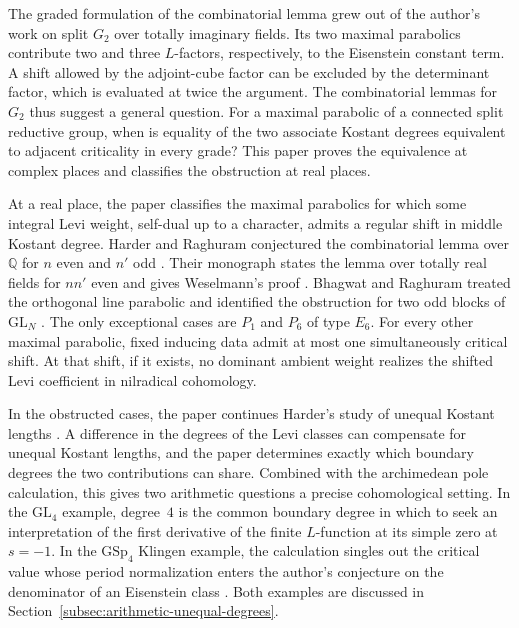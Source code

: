 \documentclass[12pt]{amsart}
\numberwithin{equation}{section}
\theoremstyle{plain}
\theoremstyle{definition}
\theoremstyle{remark}
\newcommand{\GL}{\mathrm{GL}}
\newcommand{\GSp}{\mathrm{GSp}}
\begin{document}
The graded formulation of the combinatorial lemma grew out of the author's work on split $G_2$ over totally imaginary fields. Its two maximal parabolics contribute two and three $L$-factors, respectively, to the Eisenstein constant term. A shift allowed by the adjoint-cube factor can be excluded by the determinant factor, which is evaluated at twice the argument. The combinatorial lemmas for $G_2$ \cite[Lemmas~6.1--6.2]{HosseiniJafariG2} thus suggest a general question. For a maximal parabolic of a connected split reductive group, when is equality of the two associate Kostant degrees equivalent to adjacent criticality in every grade? This paper proves the equivalence at complex places and classifies the obstruction at real places.

At a real place, the paper classifies the maximal parabolics for which some integral Levi weight, self-dual up to a character, admits a regular shift in middle Kostant degree. Harder and Raghuram conjectured the combinatorial lemma over $\mathbb Q$ for $n$ even and $n'$ odd \cite[Conj.~5.1]{HarderRaghuram2011}. Their monograph states the lemma over totally real fields for $nn'$ even and gives Weselmann's proof \cite[Lemma~7.14 and \S7.2.4]{HarderRaghuram2020}. Bhagwat and Raghuram treated the orthogonal line parabolic \cite[\S5.3]{BhagwatRaghuram2025} and identified the obstruction for two odd blocks of $\GL_N$ \cite[\S7.4.1]{HarderRaghuram2020}. The only exceptional cases are $P_1$ and $P_6$ of type $E_6$. For every other maximal parabolic, fixed inducing data admit at most one simultaneously critical shift. At that shift, if it exists, no dominant ambient weight realizes the shifted Levi coefficient in nilradical cohomology.

In the obstructed cases, the paper continues Harder's study of unequal Kostant lengths \cite[\S9.3.1, pp.~421--422]{HarderChapterNine}. A difference in the degrees of the Levi classes can compensate for unequal Kostant lengths, and the paper determines exactly which boundary degrees the two contributions can share. Combined with the archimedean pole calculation, this gives two arithmetic questions a precise cohomological setting. In the $\GL_4$ example, degree~$4$ is the common boundary degree in which to seek an interpretation of the first derivative of the finite $L$-function at its simple zero at $s=-1$. In the $\GSp_4$ Klingen example, the calculation singles out the critical value whose period normalization enters the author's conjecture on the denominator of an Eisenstein class \cite{HosseiniJafariKlingen}. Both examples are discussed in Section~\ref{subsec:arithmetic-unequal-degrees}.
\end{document}
